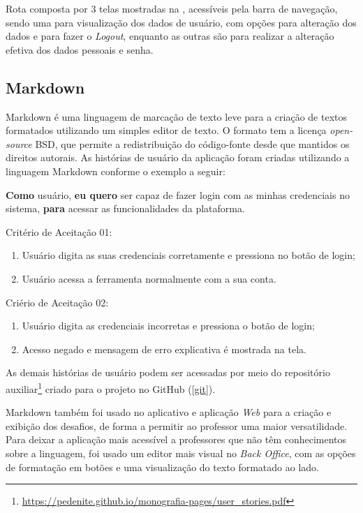 Rota composta por 3 telas mostradas na , acessíveis pela barra de navegação, sendo uma para visualização dos dados de usuário, com opções para alteração dos dados e para fazer o \textit{Logout}, enquanto as outras são para realizar a alteração efetiva dos dados pessoais e senha.


\subsection{Markdown}
\label{hus}

Markdown \cite{markdown} é uma linguagem de marcação de texto leve para a criação de textos formatados utilizando um simples editor de texto. O formato tem a licença \textit{open-source} BSD, que permite a redistribuição do código-fonte desde que mantidos os direitos autorais. As histórias de usuário da aplicação foram criadas utilizando a linguagem Markdown conforme o exemplo a seguir:

\textbf{Como} usuário, 
\textbf{eu quero} ser capaz de fazer login com as minhas credenciais no sistema, 
\textbf{para} acessar as funcionalidades da plataforma.

Critério de Aceitação 01:
\begin{enumerate}
    \item Usuário digita as suas credenciais corretamente e pressiona no botão de login;
    \item Usuário acessa a ferramenta normalmente com a sua conta.
\end{enumerate}

Criério de Aceitação 02:
\begin{enumerate}
    \item Usuário digita as credenciais incorretas e pressiona o botão de login;
    \item Acesso negado e mensagem de erro explicativa é mostrada na tela.
\end{enumerate}

As demais histórias de usuário podem ser acessadas por meio do repositório auxiliar\footnote{\url{https://pedenite.github.io/monografia-pages/user_stories.pdf}} criado para o projeto no GitHub (\ref{git}).

Markdown também foi usado no aplicativo e aplicação \textit{Web} para a criação e exibição dos desafios, de forma a permitir ao professor uma maior versatilidade. Para deixar a aplicação mais acessível a professores que não têm conhecimentos sobre a linguagem, foi usado um editor mais visual no \textit{Back Office}, com as opções de formatação em botões e uma visualização do texto formatado ao lado.

